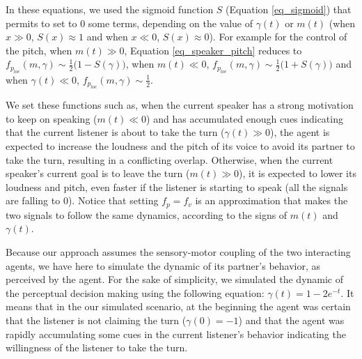 
In these equations, we used the sigmoid function $S$ (Equation \ref{eq_sigmoid}) that permits to set to $0$ some terms, depending on the value of $\gamma(t)$ or $m(t)$ (when $x \gg 0$, $S(x)\approx 1$ and when $x \ll 0$, $S(x)\approx 0$). 
For example for the control of the pitch, 
when $m(t) \gg 0$, Equation \ref{eq_speaker_pitch} reduces to $f_{p_{loc}}(m,\gamma) \sim \frac{1}{2}\big( 1-S(\gamma) \big)$, 
when $m(t) \ll 0$, $f_{p_{loc}}(m,\gamma) \sim \frac{1}{2}\big( 1 + S(\gamma)\big)$ 
and when $\gamma(t) \ll 0$, $f_{p_{loc}}(m,\gamma) \sim \frac{1}{2}$. 

We set these functions such as, when the current speaker has a strong motivation to keep on speaking ($m(t) \ll 0$) and has accumulated enough cues indicating that the current listener is about to take the turn  ($\gamma(t) \gg 0$), the agent is expected to increase the loudness and the pitch of its voice to avoid its partner to take the turn, resulting in a conflicting overlap. 
Otherwise, when the current speaker's current goal is to leave the turn ($m(t) \gg 0$), it is expected to lower its loudness and pitch, even faster if the listener is starting to speak (all the signals are falling to 0).
Notice that setting $f_p = f_v$ is an approximation that makes the two signals to follow the same dynamics, according to the signs of $m(t)$ and $\gamma(t)$. 

Because our approach assumes the sensory-motor coupling of the two interacting agents, we have here to simulate the dynamic of its partner's behavior, as perceived by the agent.
For the sake of simplicity, we simulated the dynamic of the perceptual decision making using the following equation: $\gamma(t)=1-2e^{-t}$. 
It means that in the our simulated scenario, at the beginning the agent was certain that the listener is not claiming the turn ($\gamma(0) = -1$) and that the agent was rapidly accumulating some cues in the current listener's behavior indicating the willingness of the listener to take the turn. 

